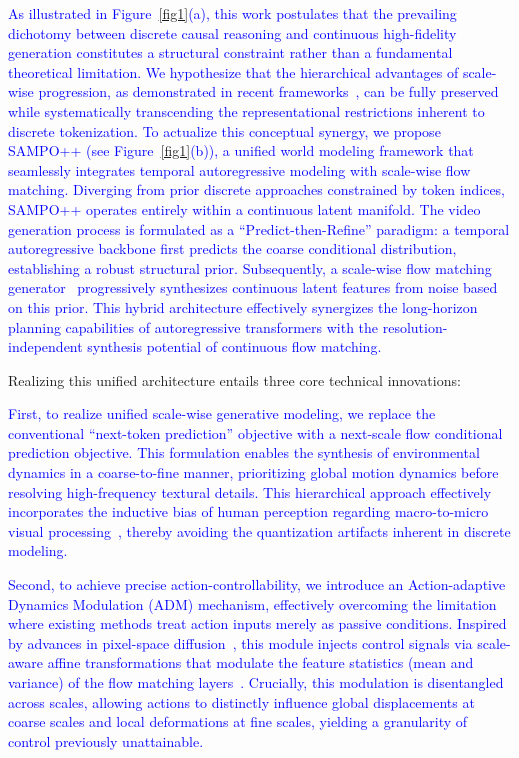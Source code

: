 \textcolor{blue}{As illustrated in Figure~\ref{fig1}\textcolor{blue}{(a)}, this work postulates that the prevailing dichotomy between discrete causal reasoning and continuous high-fidelity generation constitutes a structural constraint rather than a fundamental theoretical limitation. We hypothesize that the hierarchical advantages of scale-wise progression, as demonstrated in recent frameworks~\cite{wang2025sampo,tian2024visual,li2024autoregressive}, can be fully preserved while systematically transcending the representational restrictions inherent to discrete tokenization.
To actualize this conceptual synergy, we propose SAMPO++ (see Figure~\ref{fig1}\textcolor{blue}{(b)}), a unified world modeling framework that seamlessly integrates temporal autoregressive modeling with scale-wise flow matching. Diverging from prior discrete approaches constrained by token indices, SAMPO++ operates entirely within a continuous latent manifold. The video generation process is formulated as a ``Predict-then-Refine'' paradigm: a temporal autoregressive backbone first predicts the coarse conditional distribution, establishing a robust structural prior. Subsequently, a scale-wise flow matching generator~\cite{ren2024flowar, ma2024sit} progressively synthesizes continuous latent features from noise based on this prior. This hybrid architecture effectively synergizes the long-horizon planning capabilities of autoregressive transformers with the resolution-independent synthesis potential of continuous flow matching.}

Realizing this unified architecture entails three core technical innovations:

\textcolor{blue}{First, to realize unified scale-wise generative modeling, we replace the conventional ``next-token prediction'' objective with a next-scale flow conditional prediction objective. This formulation enables the synthesis of environmental dynamics in a coarse-to-fine manner, prioritizing global motion dynamics before resolving high-frequency textural details. This hierarchical approach effectively incorporates the inductive bias of human perception regarding macro-to-micro visual processing~\cite{denton2015deep}, thereby avoiding the quantization artifacts inherent in discrete modeling.}

\textcolor{blue}{Second, to achieve precise action-controllability, we introduce an Action-adaptive Dynamics Modulation (ADM) mechanism, effectively overcoming the limitation where existing methods treat action inputs merely as passive conditions. Inspired by advances in pixel-space diffusion~\cite{yu2025pixeldit}, this module injects control signals via scale-aware affine transformations that modulate the feature statistics (mean and variance) of the flow matching layers~\cite{park2019spade, karras2019stylegan2}. Crucially, this modulation is disentangled across scales, allowing actions to distinctly influence global displacements at coarse scales and local deformations at fine scales, yielding a granularity of control previously unattainable.}

